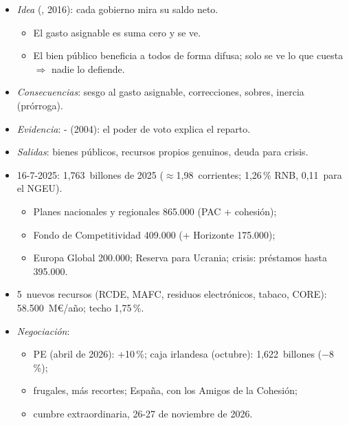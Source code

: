 \documentclass{article}
\begin{document}
\begin{columnas}
\begin{itemize}
\item \emph{Idea} (, 2016): cada gobierno mira su saldo neto.
  \begin{itemize}
  \item El gasto asignable es suma cero y se ve.
  \item El bien público beneficia a todos de forma difusa; solo se ve lo que cuesta $\Rightarrow$ nadie lo defiende.
  \end{itemize}
\item \emph{Consecuencias}: sesgo al gasto asignable, correcciones, sobres, inercia (prórroga).
\item \emph{Evidencia}: - (2004): el poder de voto explica el reparto.
\item \emph{Salidas}: bienes públicos, recursos propios genuinos, deuda para crisis.
\end{itemize}

\begin{itemize}
\item 16-7-2025: 1,763~billones de 2025 ($\approx$1,98~corrientes; 1,26\,\% RNB, 0,11~para el NGEU).
  \begin{itemize}
  \item Planes nacionales y regionales 865.000 (PAC + cohesión);
  \item Fondo de Competitividad 409.000 (+ Horizonte 175.000);
  \item Europa Global 200.000; Reserva para Ucrania; crisis: préstamos hasta 395.000.
  \end{itemize}
\item 5~nuevos recursos (RCDE, MAFC, residuos electrónicos, tabaco, CORE): 58.500~M€/año; techo 1,75\,\%.
\end{itemize}
\begin{itemize}
\item \emph{Negociación}:
  \begin{itemize}
  \item PE (abril de 2026): +10\,\%; caja irlandesa (octubre): 1,622~billones ($-$8\,\%);
  \item frugales, más recortes; España, con los Amigos de la Cohesión;
  \item cumbre extraordinaria, 26-27 de noviembre de 2026.
  \end{itemize}
\end{itemize}


\end{columnas}
\end{document}
